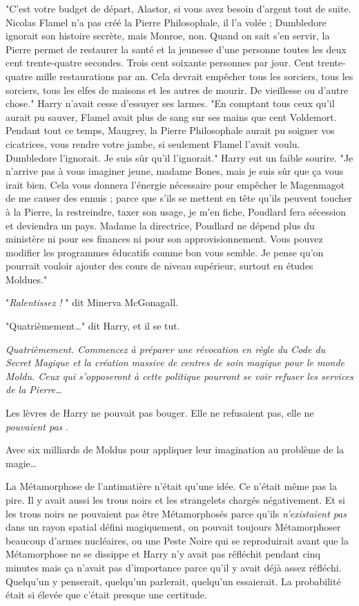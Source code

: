 "C'est votre budget de départ, Alastor, si vous avez besoin d'argent tout de suite. Nicolas Flamel n'a pas créé la Pierre Philosophale, il l'a volée ; Dumbledore ignorait son histoire secrète, mais Monroe, non. Quand on sait s'en servir, la Pierre permet de restaurer la santé et la jeunesse d'une personne toutes les deux cent trente-quatre secondes. Trois cent soixante personnes par jour. Cent trente-quatre mille restaurations par an. Cela devrait empêcher tous les sorciers, tous les sorciers, tous les elfes de maisons et les autres de mourir. De vieillesse ou d'autre chose." Harry n'avait cesse d'essuyer ses larmes. "En comptant tous ceux qu'il aurait pu sauver, Flamel avait plus de sang sur ses mains que cent Voldemort. Pendant tout ce temps, Maugrey, la Pierre Philosophale aurait pu soigner vos cicatrices, vous rendre votre jambe, si seulement Flamel l'avait voulu. Dumbledore l'ignorait. Je suis sûr qu'il l'ignorait." Harry eut un faible sourire. "Je n'arrive pas à vous imaginer jeune, madame Bones, mais je suis sûr que ça vous irait bien. Cela vous donnera l'énergie nécessaire pour empêcher le Magenmagot de me causer des ennuis ; parce que s'ils se mettent en tête qu'ils peuvent toucher à la Pierre, la restreindre, taxer son usage, je m'en fiche, Poudlard fera sécession et deviendra un pays. Madame la directrice, Poudlard ne dépend plus du ministère ni pour ses finances ni pour son approvisionnement. Vous pouvez modifier les programmes éducatifs comme bon vous semble. Je pense qu'on pourrait vouloir ajouter des cours de niveau supérieur, surtout en études Moldues."

"\emph{Ralentissez !} " dit Minerva McGonagall.

"Quatrièmement…" dit Harry, et il se tut.

\emph{Quatrièmement. Commencez à préparer une révocation en règle du Code du Secret Magique et la création massive de centres de soin magique pour le monde Moldu. Ceux qui s'opposeront à cette politique pourront se voir refuser les services de la Pierre…} 

Les lèvres de Harry ne pouvait pas bouger. Elle ne refusaient pas, elle ne \emph{pouvaient pas} .

Avec six milliards de Moldus pour appliquer leur imagination au problème de la magie…

La Métamorphose de l'antimatière n'était qu'une idée. Ce n'était même pas la pire. Il y avait aussi les trous noirs et les strangelets chargés négativement. Et si les trous noirs ne pouvaient pas être Métamorphosés parce qu'ils \emph{n'existaient pas}  dans un rayon spatial défini magiquement, on pouvait toujours Métamorphoser beaucoup d'armes nucléaires, ou une Peste Noire qui se reproduirait avant que la Métamorphose ne se dissippe et Harry n'y avait pas réfléchit pendant cinq minutes mais ça n'avait pas d'importance parce qu'il y avait déjà assez réfléchi. Quelqu'un y penserait, quelqu'un parlerait, quelqu'un essaierait. La probabilité était si élevée que c'était presque une certitude.

